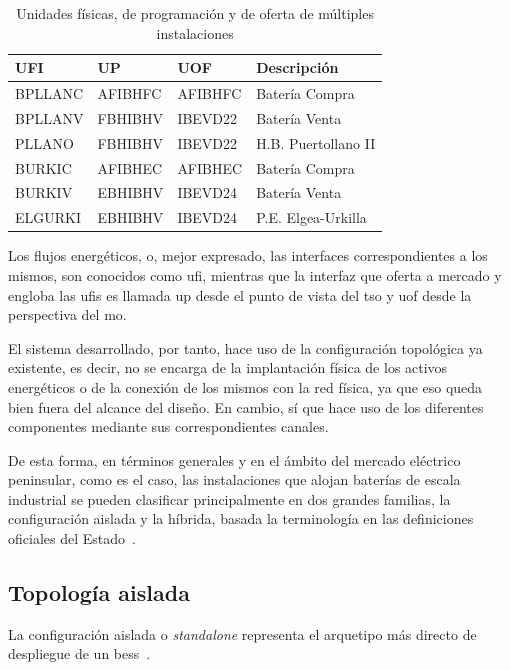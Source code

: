 \begin{table}[ht]
  \centering
  \begin{tabular}{|l|l|l|l|}
    \hline
    UFI     & UP      & UOF     & Descripción         \\
    \hline
    BPLLANC & AFIBHFC & AFIBHFC & Batería Compra      \\
    BPLLANV & FBHIBHV & IBEVD22 & Batería Venta       \\
    PLLANO  & FBHIBHV & IBEVD22 & H.B. Puertollano II \\
    BURKIC  & AFIBHEC & AFIBHEC & Batería Compra      \\
    BURKIV  & EBHIBHV & IBEVD24 & Batería Venta       \\
    ELGURKI & EBHIBHV & IBEVD24 & P.E. Elgea-Urkilla  \\
    \hline
  \end{tabular}
  \caption{Unidades físicas, de programación y de oferta de múltiples instalaciones}
  \label{tab:unidades-fisicas}
\end{table}

Los flujos energéticos, o, mejor expresado, las interfaces correspondientes a los mismos, son conocidos como \gls{ufi}, mientras que la interfaz que oferta a mercado y engloba las \glspl{ufi} es llamada \gls{up} desde el punto de vista del \gls{tso} y \gls{uof} desde la perspectiva del \gls{mo}.

El sistema desarrollado, por tanto, hace uso de la configuración topológica ya existente, es decir, no se encarga de la implantación física de los activos energéticos o de la conexión de los mismos con la red física, ya que eso queda bien fuera del alcance del diseño. En cambio, sí que hace uso de los diferentes componentes mediante sus correspondientes canales.

De esta forma, en términos generales y en el ámbito del mercado eléctrico peninsular, como es el caso, las instalaciones que alojan baterías de escala industrial se pueden clasificar principalmente en dos grandes familias, la configuración aislada y la híbrida, basada la terminología en las definiciones oficiales del Estado~\cite{cnmc2024servicios}.

\subsection{Topología aislada}
\label{makereference3.1.1}

La configuración aislada o \textit{standalone} representa el arquetipo más directo de despliegue de un \gls{bess}~\cite{gallo2023stand}.


